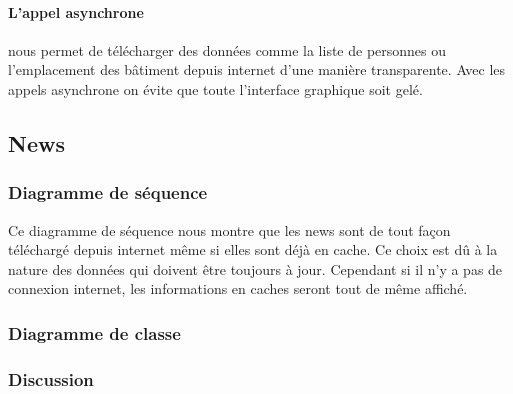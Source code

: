 		\paragraph{L'appel asynchrone} nous permet de télécharger des données comme la liste de personnes ou l'emplacement des bâtiment depuis internet d'une manière transparente. Avec les appels asynchrone on évite que toute l'interface graphique soit gelé.


	\subsection{News}
			\subsubsection*{Diagramme de séquence}
				Ce diagramme de séquence nous montre que les news sont de tout façon téléchargé depuis internet même si elles sont déjà en cache. Ce choix est dû à la nature des données qui doivent être toujours à jour. Cependant si il n'y a pas de connexion internet, les informations en caches seront tout de même affiché. 
			\subsubsection*{Diagramme de classe}
			\subsubsection*{Discussion}
			
			
